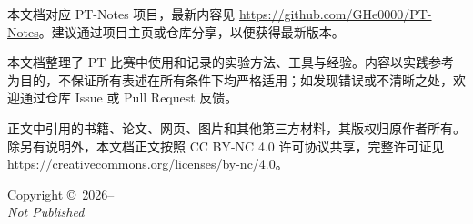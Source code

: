 \thispagestyle{empty}
\vspace*{\fill}

\noindent
本文档对应 PT-Notes 项目，最新内容见
\url{https://github.com/GHe0000/PT-Notes}。建议通过项目主页或仓库分享，以便获得最新版本。\par\medskip

\noindent
本文档整理了 PT 比赛中使用和记录的实验方法、工具与经验。内容以实践参考为目的，不保证所有表述在所有条件下均严格适用；如发现错误或不清晰之处，欢迎通过仓库 Issue 或 Pull Request 反馈。\par\medskip

\noindent
正文中引用的书籍、论文、网页、图片和其他第三方材料，其版权归原作者所有。除另有说明外，本文档正文按照 CC BY-NC 4.0 许可协议共享，完整许可证见
\url{https://creativecommons.org/licenses/by-nc/4.0}。\par\medskip

\noindent
Copyright \copyright\ 2026--\the\year\ \BookAuthor\\
\textit{Not Published}
